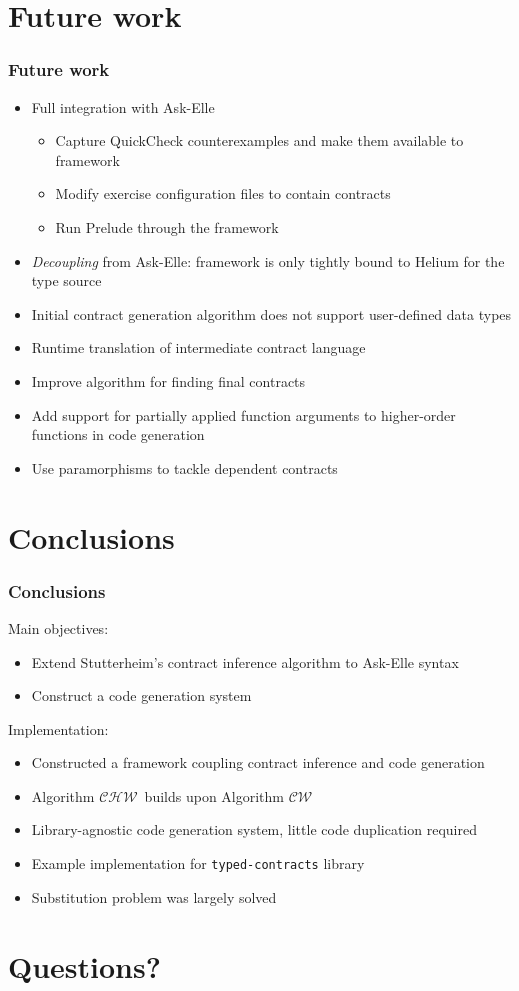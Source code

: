 \documentclass[]{beamer}
\newcommand{\CW}{$\mathcal{CW}$}
\newcommand{\CHW}{$\mathcal{CHW}$}
\begin{document}
\section{Future work}

\begin{frame}
\frametitle{Future work}

\begin{itemize}
	\item Full integration with Ask-Elle
	\begin{itemize}
		\item Capture QuickCheck counterexamples and make them available to framework
		\item Modify exercise configuration files to contain contracts
		\item Run Prelude through the framework
	\end{itemize}
	\item \textit{Decoupling} from Ask-Elle: framework is only tightly bound to Helium for the type source
	\item Initial contract generation algorithm does not support user-defined data types
	\item Runtime translation of intermediate contract language
	\item Improve algorithm for finding final contracts
	\item Add support for partially applied function arguments to higher-order functions in code generation
	\item Use paramorphisms to tackle dependent contracts
\end{itemize}

\end{frame}

\section{Conclusions}

\begin{frame}
\frametitle{Conclusions}

Main objectives:
\begin{itemize}
	\item Extend Stutterheim's contract inference algorithm to Ask-Elle syntax
	\item Construct a code generation system
\end{itemize}

Implementation:
\begin{itemize}
	\item Constructed a framework coupling contract inference and code generation
	\item Algorithm \CHW ~builds upon Algorithm \CW
	\item Library-agnostic code generation system, little code duplication required
	\item Example implementation for \texttt{typed-contracts} library
	\item Substitution problem was largely solved
\end{itemize}

\end{frame}

\section*{Questions?}
\end{document}
